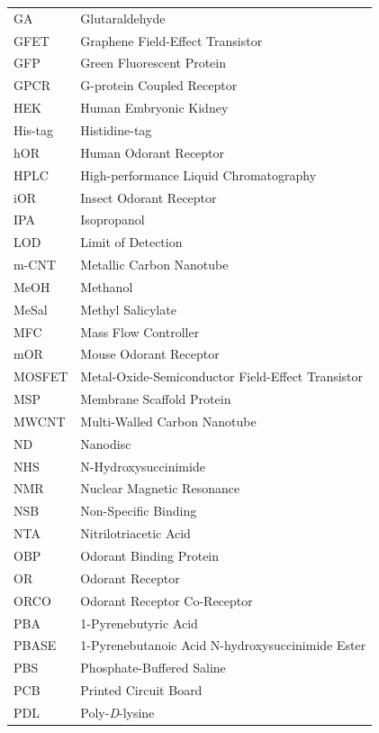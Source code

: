 \documentclass[
  a4paper,
]{scrbook}
\begin{document}
\newpage
\fancyhf{} %
\thispagestyle{fancy} %
\renewcommand{\headrulewidth}{0pt}
\fancyfoot[L]{\thepage} %
\begin{table}[H]
  \begin{tabular}{@{}p{} p{}@{}}  %
    GA  & Glutaraldehyde  \\[5pt]
    GFET  & Graphene Field-Effect Transistor  \\[5pt]
    GFP  & Green Fluorescent Protein  \\[5pt]
    GPCR  & G-protein Coupled Receptor  \\[5pt]
    HEK  & Human Embryonic Kidney  \\[5pt]
    His-tag  & Histidine-tag  \\[5pt]
    hOR  & Human Odorant Receptor  \\[5pt]
    HPLC  & High-performance Liquid Chromatography   \\[5pt]
    iOR  & Insect Odorant Receptor  \\[5pt]
    IPA  & Isopropanol  \\[5pt]
    LOD  & Limit of Detection  \\[5pt]
    m-CNT  & Metallic Carbon Nanotube   \\[5pt]
    MeOH  & Methanol   \\[5pt]
    MeSal  & Methyl Salicylate   \\[5pt]
    MFC  & Mass Flow Controller   \\[5pt]
    mOR  & Mouse Odorant Receptor  \\[5pt]
    MOSFET  & Metal-Oxide-Semiconductor Field-Effect Transistor  \\[5pt]
    MSP  & Membrane Scaffold Protein  \\[5pt]
    MWCNT  & Multi-Walled Carbon Nanotube  \\[5pt]
    ND  & Nanodisc  \\[5pt]
    NHS  & N-Hydroxysuccinimide  \\[5pt]
    NMR  & Nuclear Magnetic Resonance  \\[5pt]
    NSB  & Non-Specific Binding   \\[5pt]
    NTA  & Nitrilotriacetic Acid   \\[5pt]
    OBP  & Odorant Binding Protein  \\[5pt]
    OR  & Odorant Receptor  \\[5pt]
    ORCO  & Odorant Receptor Co-Receptor  \\[5pt]
    PBA  & 1-Pyrenebutyric Acid  \\[5pt]
    PBASE  & 1-Pyrenebutanoic Acid N-hydroxysuccinimide Ester  \\[5pt]
    PBS  & Phosphate-Buffered Saline  \\[5pt]
    PCB  & Printed Circuit Board   \\[5pt]
    PDL & Poly-\textit{D}-lysine  \\[5pt]
  \end{tabular}
\end{table}
\end{document}
